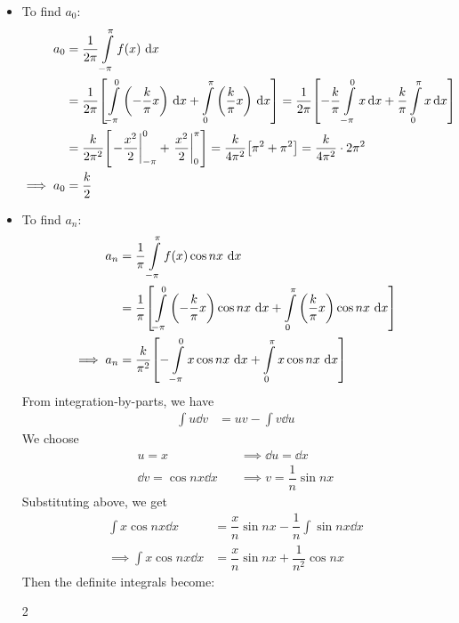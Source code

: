         \begin{itemize}
            \item To find $a_0$:
            \begin{align*}
                a_0&=\dfrac{1}{2\pi}\int\limits_{-\pi}^{\pi}{f(x)\,\dd{x}} \\
                    &=\dfrac{1}{2\pi}\qty[\int\limits_{-\pi}^{0}{\qty(-\dfrac{k}{\pi}x)\,\dd{x}}+\int\limits_{0}^{\pi}{\qty(\dfrac{k}{\pi}x)\,\dd{x}}]=\dfrac{1}{2\pi}\qty[-\dfrac{k}{\pi}\int\limits_{-\pi}^{0}{x\dd{x}}+\dfrac{k}{\pi}\int\limits_{0}^{\pi}{x\dd{x}}]\\
                    &=\dfrac{k}{2\pi^2}\qty[\left.-\dfrac{x^2}{2}\right|_{-\pi}^{0}+\left.\dfrac{x^2}{2}\right|_{0}^{\pi}]=\dfrac{k}{4\pi^2}\qty[\pi^2+\pi^2]=\dfrac{k}{4\pi^2}\cdot 2\pi^2 \\
                \implies a_0&=\dfrac{k}{2}
            \end{align*}

            \item To find $a_n$:
            \begin{align}
                a_n&=\dfrac{1}{\pi}\int\limits_{-\pi}^{\pi}{f(x)\cos{nx}\,\dd{x}} \nonumber\\
                    &=\dfrac{1}{\pi}\qty[\int\limits_{-\pi}^{0}{\qty(-\dfrac{k}{\pi}x)\cos{nx}\,\dd{x}}+\int\limits_{0}^{\pi}{\qty(\dfrac{k}{\pi}x)\cos{nx}\,\dd{x}}] \nonumber\\
                \implies a_n&=\dfrac{k}{\pi^2}\qty[-\int\limits_{-\pi}^{0}{x\cos{nx}\,\dd{x}}+\int\limits_{0}^{\pi}{x\cos{nx}\,\dd{x}}] \label{eqn:triangular:an}
            \end{align}
            From integration-by-parts, we have
            \begin{align*}
                \int{u\dd{v}}&=uv-\int{v\dd{u}}
            \end{align*}
            We choose
            \begin{align*}
                u=x&\quad\implies\dd{u}=\dd{x} \\
                \dd{v}=\cos{nx}\dd{x}&\quad\implies v=\dfrac{1}{n}\sin{nx}
            \end{align*}
            Substituting above, we get
            \begin{align*}
                \int{x\cos{nx}\dd{x}}&=\dfrac{x}{n}\sin{nx}-\dfrac{1}{n}\int{\sin{nx}\dd{x}} \\
                \implies\int{x\cos{nx}\dd{x}}&=\dfrac{x}{n}\sin{nx}+\dfrac{1}{n^2}\cos{nx}
            \end{align*}
            Then the definite integrals become:\vspace{-3ex}
            \begin{multicols}{2}


\end{multicols}
\end{itemize}
